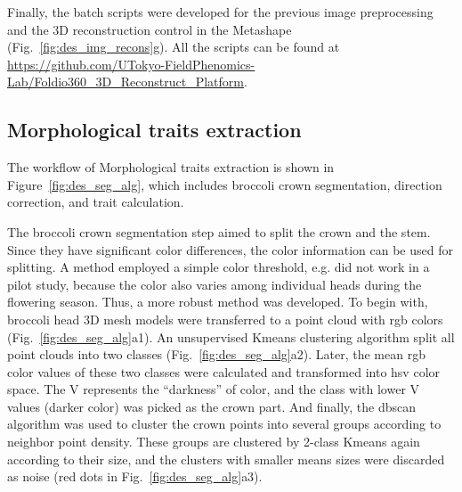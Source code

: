 Finally, the batch scripts were developed for the previous image preprocessing and the 3D reconstruction control in the Metashape (Fig.~\ref{fig:des_img_recons}g). All the scripts can be found at \url{https://github.com/UTokyo-FieldPhenomics-Lab/Foldio360_3D_Reconstruct_Platform}.

\subsection{Morphological traits extraction}\label{sec:mte}

The workflow of Morphological traits extraction is shown in Figure~\ref{fig:des_seg_alg}, which includes broccoli crown segmentation, direction correction, and trait calculation.



The broccoli crown segmentation step aimed to split the crown and the stem. Since they have significant color differences, the color information can be used for splitting. A method employed a simple color threshold, e.g. \citet{otsu_threshold_1979} did not work in a pilot study, because the color also varies among individual heads during the flowering season. Thus, a more robust method was developed. To begin with, broccoli head 3D mesh models were transferred to a point cloud with \gls{rgb} colors (Fig.~\ref{fig:des_seg_alg}a1). An unsupervised Kmeans clustering algorithm split all point clouds into two classes (Fig.~\ref{fig:des_seg_alg}a2). Later, the mean \gls{rgb} color values of these two classes were calculated and transformed into \gls{hsv} color space. The V represents the ``darkness'' of color, and the class with lower V values (darker color) was picked as the crown part. And finally, the \gls{dbscan} algorithm was used to cluster the crown points into several groups according to neighbor point density. These groups are clustered by 2-class Kmeans again according to their size, and the clusters with smaller means sizes were discarded as noise (red dots in Fig.~\ref{fig:des_seg_alg}a3).

